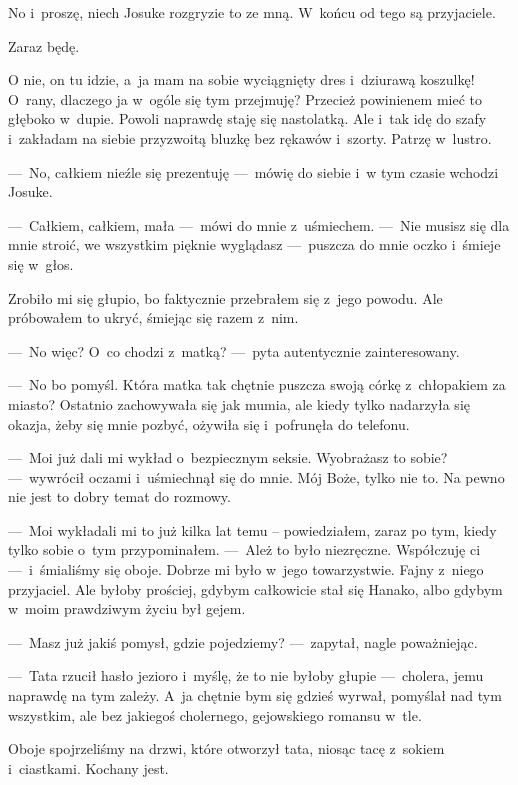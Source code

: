 No i~proszę, niech Josuke rozgryzie to ze mną. W~końcu od tego są przyjaciele.

\begin{sms}
Zaraz będę.
\end{sms}

O nie, on tu idzie, a~ja mam na sobie wyciągnięty dres i~dziurawą koszulkę! O~rany, dlaczego ja w~ogóle się tym przejmuję? Przecież powinienem mieć to głęboko w~dupie. Powoli naprawdę staję się  nastolatką. Ale i~tak idę do szafy i~zakładam na siebie przyzwoitą bluzkę bez rękawów i~szorty. Patrzę w~lustro.

---~No, całkiem nieźle się prezentuję ---~mówię do siebie i~w tym czasie wchodzi Josuke.

---~Całkiem, całkiem, mała ---~mówi do mnie z~uśmiechem. ---~Nie musisz się dla mnie stroić, we wszystkim pięknie wyglądasz ---~puszcza do mnie oczko i~śmieje się w~głos. 

Zrobiło mi się głupio, bo faktycznie przebrałem się z~jego powodu. Ale próbowałem to ukryć, śmiejąc się razem z~nim.

---~No więc? O~co chodzi z~matką? ---~pyta autentycznie zainteresowany.

---~No bo pomyśl. Która matka tak chętnie puszcza swoją córkę z~chłopakiem za miasto? Ostatnio zachowywała się jak mumia, ale kiedy tylko nadarzyła się okazja, żeby się mnie pozbyć, ożywiła się i~pofrunęła do telefonu.

---~Moi już dali mi wykład o~bezpiecznym seksie. Wyobrażasz to sobie? ---~wywrócił oczami i~uśmiechnął się do mnie. Mój Boże, tylko nie to. Na pewno nie jest to dobry temat do rozmowy.

---~Moi wykładali mi to już kilka lat temu -- powiedziałem, zaraz po tym, kiedy tylko sobie o~tym przypominałem. ---~Ależ to było niezręczne. Współczuję ci ---~i~śmialiśmy się oboje. Dobrze mi było w~jego towarzystwie. Fajny z~niego przyjaciel. Ale byłoby prościej, gdybym całkowicie stał się Hanako, albo gdybym w~moim prawdziwym życiu był gejem.

---~Masz już jakiś pomysł, gdzie pojedziemy? ---~zapytał, nagle poważniejąc.

---~Tata rzucił hasło jezioro i~myślę, że to nie byłoby głupie ---~cholera, jemu naprawdę na tym zależy.  A~ja chętnie bym się gdzieś wyrwał, pomyślał nad tym wszystkim, ale bez jakiegoś cholernego, gejowskiego romansu w~tle. 

Oboje spojrzeliśmy na drzwi, które otworzył tata, niosąc tacę z~sokiem i~ciastkami. Kochany jest. 


